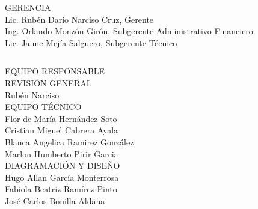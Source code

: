 {\begin{center}
		
		
		
		
		{\Bold \large \color{color2} GERENCIA}\\[0.2cm]
		Lic. Rubén Darío Narciso Cruz, Gerente\\
		Ing. Orlando Monzón Girón, Subgerente Administrativo Financiero\\
		Lic. Jaime Mejía Salguero, Subgerente Técnico\\
		
		
	\end{center}
}{}
\clearpage

$\ $
\vspace{0.5cm}

\begin{center}
	{\Bold \LARGE EQUIPO RESPONSABLE}\\[1.5cm]
	
	{\Bold \large \color{color2} REVISIÓN GENERAL}\\[0.2cm]
	Rubén Narciso\\[0.8cm]
	
	
	{\Bold \large \color{color2} EQUIPO TÉCNICO}\\[0.2cm]
	Flor de María Hernández Soto\\
	Cristian Miguel Cabrera Ayala\\
	Blanca Angelica Ramirez González\\
	Marlon Humberto Pirir Garcia\\[0.8cm]
	
	{\Bold \large \color{color2} DIAGRAMACIÓN Y DISEÑO}\\[0.2cm]
	Hugo Allan García Monterrosa\\
	Fabiola Beatriz Ramírez Pinto\\
	José Carlos Bonilla Aldana\\[0.8cm]
	
	
	
\end{center}\setcounter{page}{0}\cleardoublepage



$\ $\\[0.7cm]

\tableofcontents

\cleardoublepage
\pagestyle{estandar}
\setcounter{page}{1}
\setlength{\arrayrulewidth}{1.0pt}


\cleardoublepage





$\ $\\[0.5cm]
\thispagestyle{empty}




